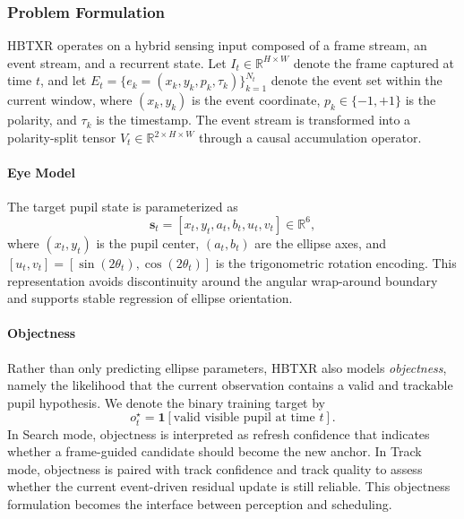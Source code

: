 \documentclass[journal]{IEEEtran}
\newcommand{\R}{\mathbb{R}}
\begin{document}
\subsubsection{Problem Formulation}
HBTXR operates on a hybrid sensing input composed of a frame stream, an event stream, and a recurrent state. Let $I_t \in \R^{H\times W}$ denote the frame captured at time $t$, and let $E_t = \{e_k=(x_k,y_k,p_k,\tau_k)\}_{k=1}^{N_t}$ denote the event set within the current window, where $(x_k,y_k)$ is the event coordinate, $p_k \in \{-1,+1\}$ is the polarity, and $\tau_k$ is the timestamp. The event stream is transformed into a polarity-split tensor $V_t \in \R^{2\times H\times W}$ through a causal accumulation operator.

\paragraph*{Eye Model}
The target pupil state is parameterized as
\begin{equation}
\mathbf{s}_t = [x_t, y_t, a_t, b_t, u_t, v_t] \in \R^{6},
\end{equation}
where $(x_t,y_t)$ is the pupil center, $(a_t,b_t)$ are the ellipse axes, and $[u_t,v_t]=[\sin(2\theta_t),\cos(2\theta_t)]$ is the trigonometric rotation encoding. This representation avoids discontinuity around the angular wrap-around boundary and supports stable regression of ellipse orientation.

\paragraph*{Objectness}
Rather than only predicting ellipse parameters, HBTXR also models \emph{objectness}, namely the likelihood that the current observation contains a valid and trackable pupil hypothesis. We denote the binary training target by
\begin{equation}
o_t^{\star}=\mathbf{1}[\text{valid visible pupil at time } t].
\end{equation}
In Search mode, objectness is interpreted as refresh confidence that indicates whether a frame-guided candidate should become the new anchor. In Track mode, objectness is paired with track confidence and track quality to assess whether the current event-driven residual update is still reliable. This objectness formulation becomes the interface between perception and scheduling.
\end{document}
